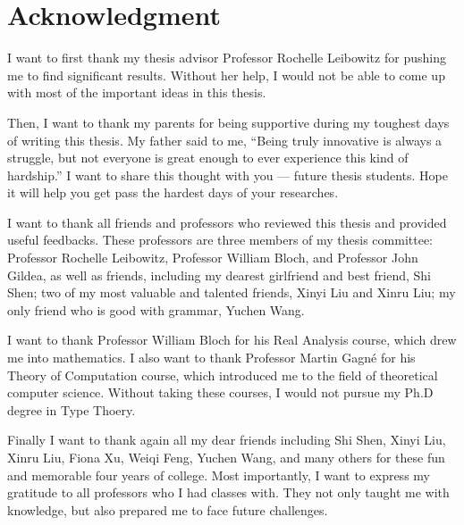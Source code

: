 \chapter{Acknowledgment}

I want to first thank my thesis advisor Professor
Rochelle Leibowitz for pushing me to find significant results.
Without her help,
I would not be able to come up with most of the important
ideas in this thesis.

Then, I want to thank my parents for being supportive
during my toughest days of writing this thesis.
My father said to me,
``Being truly innovative is always a struggle,
but not everyone is great enough
to ever experience this kind of hardship.''
I want to share this thought with you --- future thesis students.
Hope it will help you get pass
the hardest days of your researches.

I want to thank all friends and professors who
reviewed this thesis and provided useful feedbacks.
These professors are three members of my thesis committee:
Professor Rochelle Leibowitz,
Professor William Bloch,
and Professor John Gildea,
as well as friends, including
my dearest girlfriend and best friend, Shi Shen;
two of my most valuable and talented friends,
Xinyi Liu and Xinru Liu;
my only friend who is good with grammar, Yuchen Wang.

I want to thank Professor William Bloch
for his Real Analysis course,
which drew me into mathematics.
I also want to thank Professor Martin Gagné
for his Theory of Computation course,
which introduced me to the field of theoretical computer science.
Without taking these courses,
I would not pursue my Ph.D degree in Type Thoery.

Finally I want to thank again all my dear friends
including Shi Shen, Xinyi Liu, Xinru Liu, Fiona Xu, Weiqi Feng,
Yuchen Wang, and many others
for these fun and memorable four years of college.
Most importantly,
I want to express my gratitude to all professors
who I had classes with.
They not only taught me with knowledge,
but also prepared me to face future challenges.
